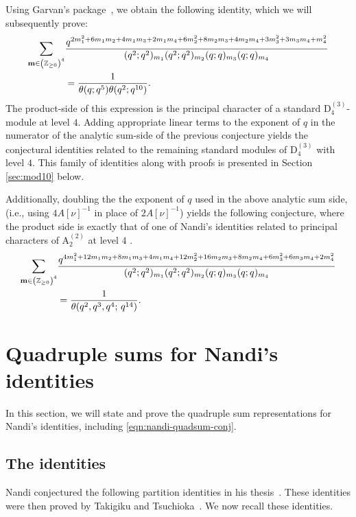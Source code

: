 \documentclass[ALCO,Unicode,published]{cedram}
\begin{document}
Using Garvan's package~\cite{Ga}, we obtain the following identity, which we will subsequently prove:
\begin{align*}
\sum_{{\bf m} \in \left(\mathbb{Z}_{\ge 0}\right)^4} &\frac{q^{ 2m_1^2+6m_1m_2+4m_1m_3+2m_1m_4+6m_2^2+8m_2m_3+4m_2m_4+3m_3^2+3m_3m_4+m_4^2}}{(q^2;q^2)_{m_1}(q^2;q^2)_{m_2}(q;q)_{m_3}(q;q)_{m_4}}
\\
&=\dfrac{1}{\theta(q;q^5)\theta(q^2;q^{10})}.
\end{align*}
The product-side of this expression is the principal character of a standard $\mathrm{D}_4^{(3)}$-module at level $4$. 
Adding appropriate linear terms to the exponent of $q$ in the numerator of the analytic sum-side of the previous conjecture yields the conjectural identities related to the remaining standard modules of $\mathrm{D}_4^{(3)}$ with level $4$. 
This family of identities along with proofs is presented in Section \ref{sec:mod10} below.

Additionally, doubling the the exponent of $q$ used in the above analytic sum side, (i.e., using $4A[\nu]^{-1}$ in place of $2A[\nu]^{-1}$) yields the following conjecture, where the product side is exactly that of one of Nandi's identities related to  principal characters of $\mathrm{A}_2^{(2)}$ at level $4$ \cite{Nan-thesis}. 
\begin{align}
\label{eqn:nandi-quadsum-conj}
\sum_{{\bf m} \in \left(\mathbb{Z}_{\ge 0}\right)^4} &\frac{q^{ 4m_1^2+12m_1m_2+8m_1m_3+4m_1m_4+12m_2^2+16m_2m_3+8m_2m_4+6m_3^2+6m_3m_4+2m_4^2}}{(q^2;q^2)_{m_1}(q^2;q^2)_{m_2}(q;q)_{m_3}(q;q)_{m_4}}
\\
&=
\dfrac{1}{\theta(q^2,q^3,q^4;\,q^{14})}.
\nonumber
\end{align}

\section{Quadruple sums for Nandi's identities}
In this section, we will state and prove the quadruple sum representations for Nandi's identities,
including \eqref{eqn:nandi-quadsum-conj}.

\subsection{The identities}
Nandi conjectured the following partition identities in his thesis~\cite{Nan-thesis}. These identities were
then proved by Takigiku and Tsuchioka~\cite{TakTsu-nandi}. We now recall these identities.
\end{document}
